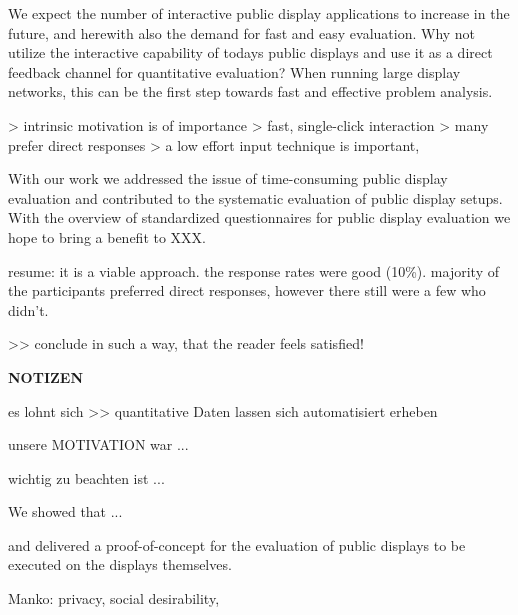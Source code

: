 	We expect the number of interactive public display applications to increase in the future, and herewith also the demand for fast and easy evaluation. 
	Why not utilize the interactive capability of todays public displays and use it as a direct feedback channel for quantitative evaluation? When running large display networks, this can be the first step towards fast and effective problem analysis.

		> intrinsic motivation is of importance
		> fast, single-click interaction
		> many prefer direct responses
		> a low effort input technique is important,



	With our work we addressed the issue of time-consuming public display evaluation and contributed to the systematic evaluation of public display setups. With the overview of standardized questionnaires for public display evaluation we hope to bring a benefit to XXX.

	resume: it is a viable approach. the response rates were good (10\%). majority of the participants preferred direct responses, however there still were a few who didn't.

	>> conclude in such a way, that the reader feels satisfied!

	












	\vfill

	\textbf{NOTIZEN}

	es lohnt sich >> quantitative Daten lassen sich automatisiert erheben
	
	unsere MOTIVATION war ...

	wichtig zu beachten ist ...

	We showed that ...

	and delivered a proof-of-concept for the evaluation of public displays to be executed on the displays themselves.

	Manko: privacy, social desirability, 
	



